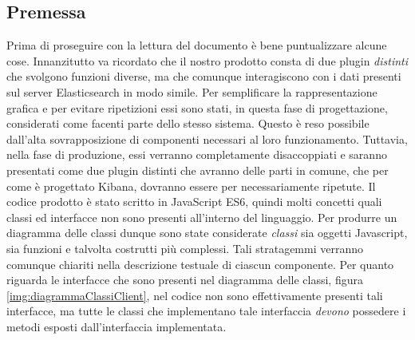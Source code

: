 \subsection{Premessa}
\label{sec:premessa}
Prima di proseguire con la lettura del documento è bene puntualizzare alcune cose.
Innanzitutto va ricordato che il nostro prodotto consta di due plugin \emph{distinti} che svolgono funzioni diverse, ma che comunque interagiscono con i dati presenti sul server Elasticsearch in modo simile. Per semplificare la rappresentazione grafica e per evitare ripetizioni essi sono stati, in questa fase di progettazione, considerati come facenti parte dello stesso sistema. Questo è reso possibile dall'alta sovrapposizione di componenti necessari al loro funzionamento. Tuttavia, nella fase di produzione, essi verranno completamente disaccoppiati e saranno presentati come due plugin distinti che avranno delle parti in comune, che per come è progettato Kibana, dovranno essere per necessariamente ripetute. 
Il codice prodotto è stato scritto in JavaScript ES6, quindi molti concetti quali classi ed interfacce non sono presenti all'interno del linguaggio. Per produrre un diagramma delle classi dunque sono state considerate \emph{ classi } sia oggetti Javascript, sia funzioni e talvolta costrutti più complessi. Tali stratagemmi verranno comunque chiariti nella descrizione testuale di ciascun componente. Per quanto riguarda le interfacce che sono presenti nel diagramma delle classi, figura \ref{img:diagrammaClassiClient}, nel codice non sono effettivamente presenti tali interfacce, ma tutte le classi che implementano tale interfaccia \emph{devono} possedere i metodi esposti dall'interfaccia implementata. 